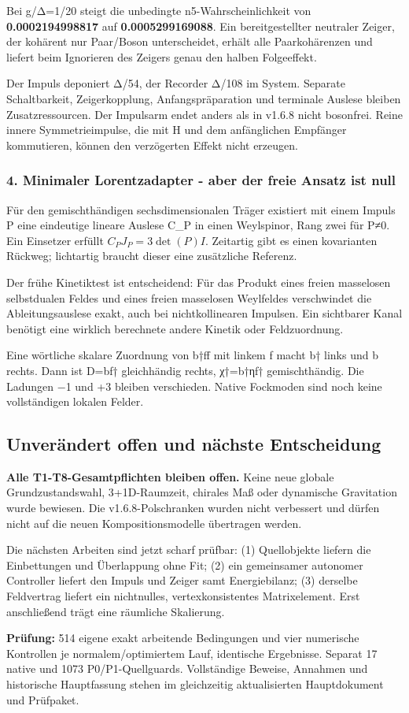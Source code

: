 \documentclass[
  ngerman,
  10pt,
  a4paper,
]{article}
\begin{document}
Bei g/Δ=1/20 steigt die unbedingte n5-Wahrscheinlichkeit von
\textbf{0.0002194998817} auf \textbf{0.0005299169088}. Ein
bereitgestellter neutraler Zeiger, der kohärent nur Paar/Boson
unterscheidet, erhält alle Paarkohärenzen und liefert beim Ignorieren
des Zeigers genau den halben Folgeeffekt.

Der Impuls deponiert Δ/54, der Recorder Δ/108 im System. Separate
Schaltbarkeit, Zeigerkopplung, Anfangspräparation und terminale Auslese
bleiben Zusatzressourcen. Der Impulsarm endet anders als in v1.6.8 nicht
bosonfrei. Reine innere Symmetrieimpulse, die mit H und dem anfänglichen
Empfänger kommutieren, können den verzögerten Effekt nicht erzeugen.

\subsubsection{4. Minimaler Lorentzadapter - aber der freie Ansatz ist
null}\label{minimaler-lorentzadapter---aber-der-freie-ansatz-ist-null}

Für den gemischthändigen sechsdimensionalen Träger existiert mit einem
Impuls P eine eindeutige lineare Auslese C\_P in einen Weylspinor, Rang
zwei für P≠0. Ein Einsetzer erfüllt \(C_PJ_P=3\det(P)I\). Zeitartig gibt
es einen kovarianten Rückweg; lichtartig braucht dieser eine zusätzliche
Referenz.

Der frühe Kinetiktest ist entscheidend: Für das Produkt eines freien
masselosen selbstdualen Feldes und eines freien masselosen Weylfeldes
verschwindet die Ableitungsauslese exakt, auch bei nichtkollinearen
Impulsen. Ein sichtbarer Kanal benötigt eine wirklich berechnete andere
Kinetik oder Feldzuordnung.

Eine wörtliche skalare Zuordnung von b†ff mit linkem f macht b† links
und b rechts. Dann ist D=bf† gleichhändig rechts, χ†=b†ηf†
gemischthändig. Die Ladungen −1 und +3 bleiben verschieden. Native
Fockmoden sind noch keine vollständigen lokalen Felder.

\subsection{Unverändert offen und nächste
Entscheidung}\label{unveruxe4ndert-offen-und-nuxe4chste-entscheidung}

\textbf{Alle T1-T8-Gesamtpflichten bleiben offen.} Keine neue globale
Grundzustandswahl, 3+1D-Raumzeit, chirales Maß oder dynamische
Gravitation wurde bewiesen. Die v1.6.8-Polschranken wurden nicht
verbessert und dürfen nicht auf die neuen Kompositionsmodelle übertragen
werden.

Die nächsten Arbeiten sind jetzt scharf prüfbar: (1) Quellobjekte
liefern die Einbettungen und Überlappung ohne Fit; (2) ein gemeinsamer
autonomer Controller liefert den Impuls und Zeiger samt Energiebilanz;
(3) derselbe Feldvertrag liefert ein nichtnulles, vertexkonsistentes
Matrixelement. Erst anschließend trägt eine räumliche Skalierung.

\textbf{Prüfung:} 514 eigene exakt arbeitende Bedingungen und vier
numerische Kontrollen je normalem/optimiertem Lauf, identische
Ergebnisse. Separat 17 native und 1073 P0/P1-Quellguards. Vollständige
Beweise, Annahmen und historische Hauptfassung stehen im gleichzeitig
aktualisierten Hauptdokument und Prüfpaket.
\end{document}
